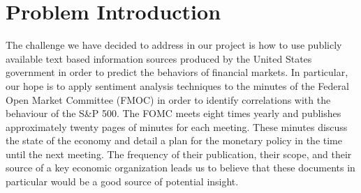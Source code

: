 \documentclass{sig-alternate-05-2015}
\begin{document}
%
\author{
%
%
\alignauthor
Aditya Bindra\\
       \\
       \\
\alignauthor
Paul Cherian\\
       \\
       \\
\alignauthor
Ben Haines\\
       \\
       \\
}
\date{30 July 1999}

\maketitle
\section{Problem Introduction}
The challenge we have decided to address in our project is
how to use publicly available text based information sources
produced by the United States government in order to predict the behaviors
of financial markets. In particular, our hope is to apply
sentiment analysis techniques to the minutes of the Federal
Open Market Committee (FMOC) in order to identify correlations with
the behaviour of the S\&P 500. The FOMC meets eight times yearly 
and publishes approximately twenty pages of minutes for each meeting.
These minutes discuss the state of the economy and detail a plan
for the monetary policy in the time until the next meeting. The 
frequency of their publication, their scope, and their source 
of a key economic organization leads us to believe that these
documents in particular would be a good source of potential 
insight.
\end{document}
